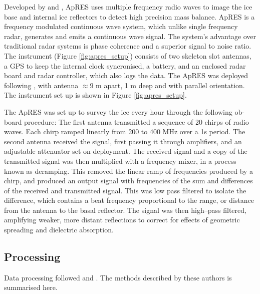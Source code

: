 Developed by \cite{brennan2014phase} and \cite{nicholls2015ground}, ApRES uses multiple frequency radio waves to image the ice base and internal ice reflectors to detect high precision mass balance.
ApRES is a frequency modulated continuous wave system, which unlike single frequency radar, generates and emits a continuous wave signal. The system's advantage over traditional radar systems is phase coherence and a superior signal to noise ratio. The instrument (Figure \ref{fig:apres_setup}) consists of two skeleton slot antennas, a GPS to keep the internal clock syncronised, a battery, and an enclosed radar board and radar controller, which also logs the data. The ApRES was deployed following \cite{nicholls2018apres}, with antenna $\approx 9$ m apart, 1 m deep and with parallel orientation. The instrument set up is shown in Figure \ref{fig:apres_setup}. 

The ApRES was set up to survey the ice every hour through the following ob-board procedure:
The first antenna transmitted a sequence of 20 chirps of radio waves. Each chirp ramped linearly from 200 to 400 MHz over a 1s period. The second antenna received the signal,  first passing it through amplifiers, and an adjustable attenuator set on deployment.  %
The received signal and a copy of the transmitted signal was then multiplied with a frequency mixer, in a process known as deramping. This removed the linear ramp of frequencies produced by a chirp, and produced an output signal with frequencies of the sum and differences of the received and transmitted signal. This was low pass filtered to isolate the difference,  which contains a beat frequency proportional to the range, or distance from the antenna to the basal reflector. 
The signal was then high--pass filtered, amplifying weaker, more distant reflections to correct for effects of geometric spreading and dielectric absorption.  




\subsection{Processing}

Data processing followed \cite{brennan2014phase} and \cite{nicholls2015ground}. The methods described by these authors is summarised here.

